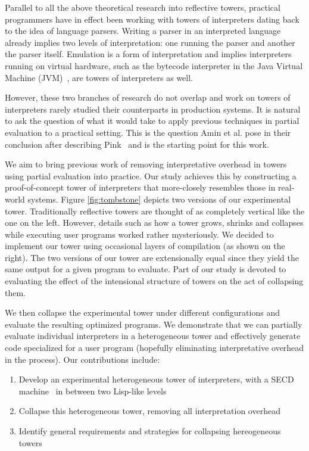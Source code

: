 \documentclass[sigplan,anonymous,review]{acmart}
\theoremstyle{definition}
\begin{document}
Parallel to all the above theoretical research into reflective towers, practical programmers have in effect been working with towers of interpreters dating back to the idea of language parsers. Writing a parser in an interpreted language already implies two levels of interpretation:
one running the parser and another the parser itself. Emulation is a form of interpretation and implies interpreters running on virtual hardware, such as the bytecode interpreter in the Java Virtual Machine (JVM)~\cite{lindholm2014java}, are towers of interpreters as well.

However, these two branches of research do not overlap and work on towers of interpreters rarely studied their counterparts in production systems. It is natural to ask the question of what it would take to apply previous techniques in partial evaluation to a practical setting. This is the question Amin et al. pose in their conclusion after describing Pink~\cite{amin2017collapsing} and is the starting point for this work.

We aim to bring previous work of removing interpretative overhead in towers using partial evaluation into practice. Our study achieves this by constructing a proof-of-concept tower of interpreters that more-closely resembles those in real-world systems. Figure \ref{fig:tombstone} depicts two versions of our experimental tower. Traditionally reflective towers are thought of as completely vertical like the one on the left. However, details such as how a tower grows, shrinks and collapses while executing user programs worked rather mysteriously. We decided to implement our tower using occasional layers of compilation (as shown on the right). The two versions of our tower are extensionally equal since they yield the same output for a given program to evaluate. Part of our study is devoted to evaluating the effect of the intensional structure of towers on the act of collapsing them.

We then collapse the experimental tower under different configurations and evaluate the resulting optimized programs. We demonstrate that we can partially evaluate individual interpreters in a heterogeneous tower and effectively generate code specialized for a user program (hopefully eliminating interpretative overhead in the process).
Our contributions include:
\begin{enumerate}
\item Develop an experimental heterogeneous tower of interpreters, with a SECD machine~\cite{landin1964mechanical,kogge1990architecture} in between two Lisp-like levels
\item Collapse this heterogeneous tower, removing all interpretation overhead
\item Identify general requirements and strategies for collapsing hereogeneous towers
\end{enumerate}
\end{document}
